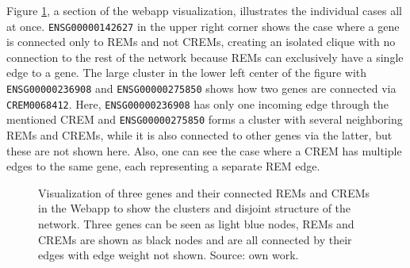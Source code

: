 \documentclass[pdftex,12pt,a4paper]{report}
\begin{document}
Figure \ref{network_webapp}, a section of the webapp visualization, illustrates the individual cases all at once. \texttt{ENSG00000142627} in the upper right corner shows the case where a gene is connected only to REMs and not CREMs, creating an isolated clique with no connection to the rest of the network because REMs can exclusively have a single edge to a gene. The large cluster in the lower left center of the figure with \texttt{ENSG00000236908} and \texttt{ENSG00000275850} shows how two genes are connected via \texttt{CREM0068412}. Here, \texttt{ENSG00000236908} has only one incoming edge through the mentioned CREM and \texttt{ENSG00000275850} forms a cluster with several neighboring REMs and CREMs, while it is also connected to other genes via the latter, but these are not shown here. Also, one can see the case where a CREM has multiple edges to the same gene, each representing a separate REM edge.
\begin{figure}[!ht]
\begin{center}
	\caption{Visualization of three genes and their connected REMs and CREMs in the Webapp to show the clusters and disjoint structure of the network. Three genes can be seen as light blue nodes, REMs and CREMs are shown as black nodes and are all connected by their edges with edge weight not shown. Source: own work.}
	\label{network_webapp}
\end{center}
\end{figure}
\end{document}
